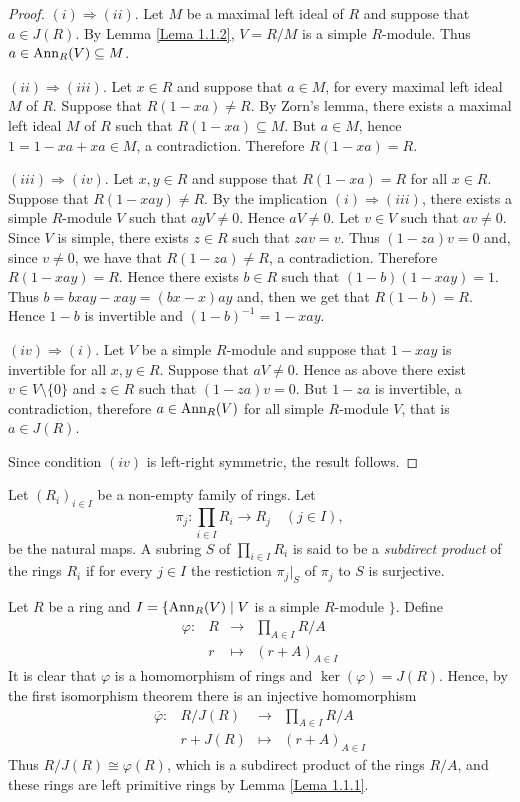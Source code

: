 \begin{proof}
$(i)\Rightarrow (ii)$. Let $M$ be a maximal left ideal of
$R$ and suppose that $a\in J(R)$. By Lemma \ref{Lema 1.1.2}, $V=R/M$ is a simple $R$-module. Thus $a\in \operatorname{Ann}_R(V)\subseteq M$.

$(ii)\Rightarrow (iii)$. Let $x\in R$ and suppose that $a\in  M$, for every maximal left ideal $M$ of $R$. Suppose that
$R(1-xa)\neq R$. By Zorn's lemma, there exists a maximal left ideal $M$ of $R$ such that
$R(1-xa)\subseteq M$. But $a\in M$, hence $1=1-xa+xa\in M$, a contradiction. Therefore $R(1-xa)=R$.

$(iii)\Rightarrow (iv)$. Let $x,y\in R$ and suppose that $R(1-xa)=R$ for all $x\in R$. Suppose that $R(1-xay)\neq
R$. By the implication $(i)\Rightarrow (iii)$, there exists a simple $R$-module $V$ such that $ayV\neq 0$. Hence $aV\neq 0$. 
Let $v\in V$ such that $av\neq
0$. Since $V$ is simple, there exists $z\in R$ such that $zav=v$. Thus
$(1-za)v=0$ and, since $v\neq 0$, we have that $R(1-za)\neq R$, a contradiction. Therefore $R(1-xay)=R$. Hence there exists $b\in R$
such that $(1-b)(1-xay)=1$. Thus $b=bxay-xay=(bx-x)ay$ and, then we get that $R(1-b)=R$. Hence $1-b$ is invertible 
and $(1-b)^{-1}=1-xay$.

$(iv)\Rightarrow (i)$. Let $V$ be a simple $R$-module and suppose that $1-xay$ is invertible for all $x,y\in R$. 
Suppose that $aV\neq 0$. Hence as above there exist $v\in V\setminus\{ 0\}$ and $z\in R$
such that $(1-za)v=0$. But $1-za$ is invertible, a contradiction, therefore $a\in \operatorname{Ann}_R(V)$ for all simple $R$-module $V$, that is 
$a\in J(R)$. 

Since condition $(iv)$ is left-right symmetric, the result follows.
\end{proof}

\begin{definition}
    Let $( R_i) _{i\in I}$ be a non-empty family of rings. Let
    \[
    \pi_j\colon\prod_{i\in I}R_i\rightarrow R_j\quad (j\in I),
    \]
    be the natural maps. A subring $S$ of $\prod_{i\in I}R_i$ is said to be a \emph{subdirect product} 
    of the rings $R_i$ if for every $j\in I$ the restiction $\pi_j|_S$ of $\pi_j$ to $S$ is surjective.
\end{definition}

Let $R$ be a ring and $I=\{ \operatorname{Ann}_R(V)\mid V$ is a simple $R$-module $\}$. Define
\[
\begin{array}{cccc}\varphi\colon &R&\rightarrow &\prod_{A\in I}R/A\\
&r&\mapsto &(r+A)_{A\in I}\end{array}
\]
It is clear that $\varphi$ is a homomorphism of rings and $\ker(\varphi
)=J(R)$. Hence, by the first isomorphism theorem there is an injective homomorphism
\[
\begin{array}{cccc}\overline{\varphi}\colon &R/J(R)&\rightarrow &\prod_{A\in I}R/A\\
&r+J(R)&\mapsto &(r+A)_{A\in I}\end{array}
\]
Thus $R/J(R)\cong \varphi (R)$, which is a subdirect product of the rings $R/A$, and these rings are left primitive rings by Lemma \ref{Lema 1.1.1}. 


